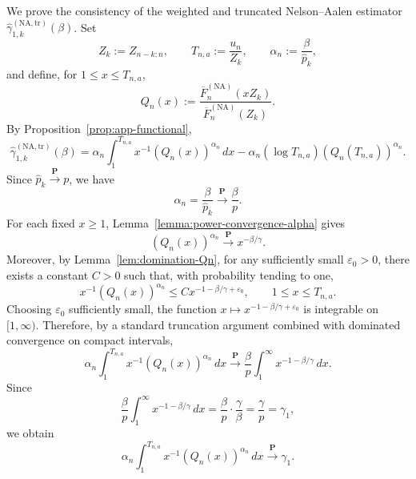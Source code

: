 \documentclass[reqno,openbib,runningheads,a4paper,12pt]{amsart}%
\begin{document}
\noindent We prove the consistency of the weighted and truncated Nelson--Aalen
estimator $\widehat{\gamma}_{1,k}^{(\mathrm{NA,tr})}(\beta)$. Set
\[
Z_{k}:=Z_{n-k:n},\qquad T_{n,a}:=\frac{u_{n}}{Z_{k}},\qquad\alpha_{n}%
:=\frac{\beta}{\widehat{p}_{k}},
\]
and define, for $1\leq x\leq T_{n,a}$,
\[
Q_{n}(x):=\frac{\overline{F}_{n}^{(\mathrm{NA})}(xZ_{k})}{\overline{F}%
_{n}^{(\mathrm{NA})}(Z_{k})}.
\]
By Proposition~\ref{prop:app-functional},
\begin{equation}
\widehat{\gamma}_{1,k}^{(\mathrm{NA,tr})}(\beta)=\alpha_{n}\int_{1}^{T_{n,a}%
}x^{-1}\left(  Q_{n}(x)\right)  ^{\alpha_{n}}\,dx-\alpha_{n}(\log
T_{n,a})\left(  Q_{n}(T_{n,a})\right)  ^{\alpha_{n}}.
\label{eq:consistency-representation}%
\end{equation}
Since $\widehat{p}_{k}\overset{\mathbf{P}}{\longrightarrow}p$, we have
\[
\alpha_{n}=\frac{\beta}{\widehat{p}_{k}}\overset{\mathbf{P}}{\longrightarrow
}\frac{\beta}{p}.
\]
For each fixed $x\geq1$, Lemma~\ref{lemma:power-convergence-alpha} gives
\[
\left(  Q_{n}(x)\right)  ^{\alpha_{n}}\overset{\mathbf{P}}{\longrightarrow
}x^{-\beta/\gamma}.
\]
Moreover, by Lemma~\ref{lem:domination-Qn}, for any sufficiently small
$\varepsilon_{0}>0$, there exists a constant $C>0$ such that, with probability
tending to one,
\[
x^{-1}\left(  Q_{n}(x)\right)  ^{\alpha_{n}}\leq Cx^{-1-\beta/\gamma
+\varepsilon_{0}},\qquad1\leq x\leq T_{n,a}.
\]
Choosing $\varepsilon_{0}$ sufficiently small, the function $x\mapsto
x^{-1-\beta/\gamma+\varepsilon_{0}}$ is integrable on $[1,\infty)$. Therefore,
by a standard truncation argument combined with dominated convergence on
compact intervals,
\[
\alpha_{n}\int_{1}^{T_{n,a}}x^{-1}\left(  Q_{n}(x)\right)  ^{\alpha_{n}%
}\,dx\overset{\mathbf{P}}{\longrightarrow}\frac{\beta}{p}\int_{1}^{\infty
}x^{-1-\beta/\gamma}\,dx.
\]
Since
\[
\frac{\beta}{p}\int_{1}^{\infty}x^{-1-\beta/\gamma}\,dx=\frac{\beta}{p}%
\cdot\frac{\gamma}{\beta}=\frac{\gamma}{p}=\gamma_{1},
\]
we obtain
\begin{equation}
\alpha_{n}\int_{1}^{T_{n,a}}x^{-1}\left(  Q_{n}(x)\right)  ^{\alpha_{n}%
}\,dx\overset{\mathbf{P}}{\longrightarrow}\gamma_{1}.
\label{eq:consistency-main}%
\end{equation}
\end{document}
